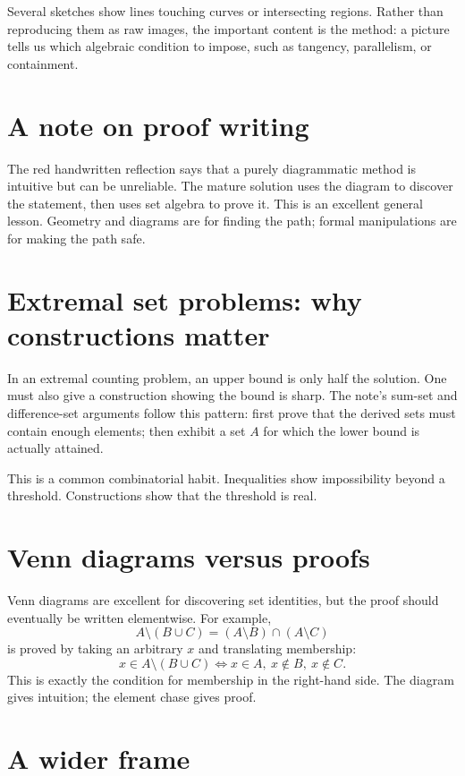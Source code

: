 Several sketches show lines touching curves or intersecting regions.  Rather than reproducing them as raw images, the important content is the method: a picture tells us which algebraic condition to impose, such as tangency, parallelism, or containment.

\section{A note on proof writing}

The red handwritten reflection says that a purely diagrammatic method is intuitive but can be unreliable.  The mature solution uses the diagram to discover the statement, then uses set algebra to prove it.  This is an excellent general lesson.  Geometry and diagrams are for finding the path; formal manipulations are for making the path safe.


\section{Extremal set problems: why constructions matter}

In an extremal counting problem, an upper bound is only half the solution.  One must also give a construction showing the bound is sharp.  The note's sum-set and difference-set arguments follow this pattern: first prove that the derived sets must contain enough elements; then exhibit a set \(A\) for which the lower bound is actually attained.

This is a common combinatorial habit.  Inequalities show impossibility beyond a threshold.  Constructions show that the threshold is real.

\section{Venn diagrams versus proofs}

Venn diagrams are excellent for discovering set identities, but the proof should eventually be written elementwise.  For example,
\[
  A\setminus(B\cup C)=(A\setminus B)\cap(A\setminus C)
\]
is proved by taking an arbitrary \(x\) and translating membership:
\[
  x\in A\setminus(B\cup C)
  \Longleftrightarrow
  x\in A,\ x\notin B,\ x\notin C.
\]
This is exactly the condition for membership in the right-hand side.  The diagram gives intuition; the element chase gives proof.

\section{A wider frame}

